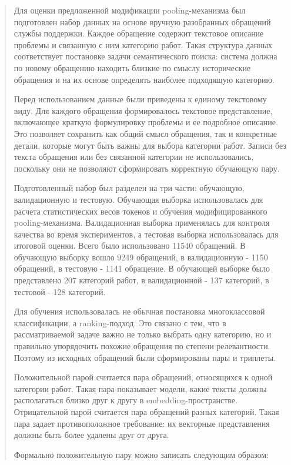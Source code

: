 \documentclass[
]{article}
\begin{document}
\begin{quote}
Для оценки предложенной модификации pooling-механизма был подготовлен
набор данных на основе вручную разобранных обращений службы поддержки.
Каждое обращение содержит текстовое описание проблемы и связанную с ним
категорию работ. Такая структура данных соответствует постановке задачи
семантического поиска: система должна по новому обращению находить
близкие по смыслу исторические обращения и на их основе определять
наиболее подходящую категорию.

Перед использованием данные были приведены к единому текстовому виду.
Для каждого обращения формировалось текстовое представление, включающее
краткую формулировку проблемы и ее подробное описание. Это позволяет
сохранить как общий смысл обращения, так и конкретные детали, которые
могут быть важны для выбора категории работ. Записи без текста обращения
или без связанной категории не использовались, поскольку они не
позволяют сформировать корректную обучающую пару.

Подготовленный набор был разделен на три части: обучающую, валидационную
и тестовую. Обучающая выборка использовалась для расчета статистических
весов токенов и обучения модифицированного pooling-механизма.
Валидационная выборка применялась для контроля качества во время
экспериментов, а тестовая выборка использовалась для итоговой оценки.
Всего было использовано 11540 обращений. В обучающую выборку вошло 9249
обращений, в валидационную - 1150 обращений, в тестовую - 1141
обращение. В обучающей выборке было представлено 207 категорий работ, в
валидационной - 137 категорий, в тестовой - 128 категорий.

Для обучения использовалась не обычная постановка многоклассовой
классификации, а ranking-подход. Это связано с тем, что в
рассматриваемой задаче важно не только выбрать одну категорию, но и
правильно упорядочить похожие обращения по степени релевантности.
Поэтому из исходных обращений были сформированы пары и триплеты.

Положительной парой считается пара обращений, относящихся к одной
категории работ. Такая пара показывает модели, какие тексты должны
располагаться близко друг к другу в embedding-пространстве.
Отрицательной парой считается пара обращений разных категорий. Такая
пара задает противоположное требование: их векторные представления
должны быть более удалены друг от друга.

Формально положительную пару можно записать следующим образом:
\end{quote}
\end{document}
